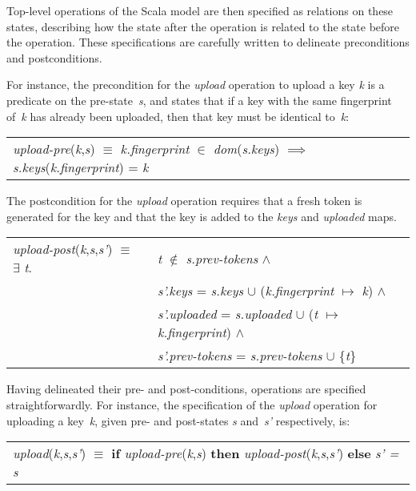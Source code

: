 \documentclass{llncs}
\begin{document}
Top-level operations of the
Scala model are then specified as relations on these states, describing
how the state after the operation is related to the state before the
operation. These specifications are carefully written to delineate
preconditions and postconditions.

For instance, the precondition for the \emph{upload} operation to
upload a key \emph{k} is a predicate on the pre-state~\emph{s}, and states
that if a key with the same fingerprint of~\emph{k} has already been uploaded, then that key must be identical to~\emph{k}:

\medskip
\noindent\begin{tabular}{l}
  \emph{upload-pre}(\emph{k},\emph{s}) $\equiv$ \emph{k.fingerprint} $\in$ \emph{dom}(\emph{s.keys}) $\implies$ \emph{s.keys}(\emph{k.fingerprint}) = \emph{k} \\
  \end{tabular}
\medskip

The postcondition for the \emph{upload} operation requires that a fresh token
is generated for the key and that the key is added to the \emph{keys} and
\emph{uploaded} maps.

\newcommand{\union}{\cup}
\medskip
\noindent\begin{tabular}{ll}
\emph{upload-post}(\emph{k},\emph{s},\emph{s'}) $\equiv$ $\exists$ \emph{t}. & \emph{t} $\notin$ \emph{s.prev-tokens}  $\land$ \\
& \emph{s'.keys} = \emph{s.keys} $\union$ (\emph{k.fingerprint} $\mapsto$ \emph{k})  $\land$ \\
& \emph{s'.uploaded} = \emph{s.uploaded} $\union$ (\emph{t} $\mapsto$ \emph{k.fingerprint})  $\land$ \\
& \emph{s'.prev-tokens} = \emph{s.prev-tokens} $\union$ \{\emph{t}\}
 \\
  \end{tabular}
\medskip

Having delineated their pre- and post-conditions, operations are specified
straightforwardly. For instance, the specification of the \emph{upload}
operation for uploading a key~\emph{k}, given pre- and post-states
\emph{s} and~\emph{s'} respectively, is:

\medskip
\noindent\begin{tabular}{l}
\emph{upload}(\emph{k},\emph{s},\emph{s'}) $\equiv$ \textbf{if} \emph{upload-pre}(\emph{k},\emph{s}) \textbf{then} \emph{upload-post}(\emph{k},\emph{s},\emph{s'}) \textbf{else} \emph{s' = s}
  \end{tabular}
\medskip
\end{document}
